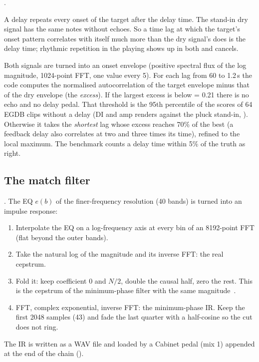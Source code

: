  \done.
\begin{keyidea}
A delay repeats every onset of the target after the delay time. The stand-in dry
signal has the same notes without echoes. So a time lag at which the target's
onset pattern correlates with itself much more than the dry signal's does is the
delay time; rhythmic repetition in the playing shows up in both and cancels.
\end{keyidea}
Both signals are turned into an onset envelope (positive spectral flux of the log
magnitude, 1024-point FFT, one value every 5\ms). For each lag from 60\ms{} to
1.2\,s the code computes the normalised autocorrelation of the target envelope
minus that of the dry envelope (the \emph{excess}). If the largest excess is
below  = 0.21 there is no echo and no delay pedal. That
threshold is the 95th percentile of the scores of 64 EGDB clips without a delay
(DI and amp renders against the pluck stand-in, ). Otherwise it takes the
\emph{shortest} lag whose excess reaches 70\% of the best (a feedback delay also
correlates at two and three times its time), refined to the local maximum. The
benchmark counts a delay time within 5\% of the truth as right.

\subsection{The match filter}
\label{sec:impl-match}

 \done. The EQ $e(b)$ of the finer-frequency resolution
(40 bands) is turned into an impulse response:
\begin{enumerate}
\item Interpolate the EQ on a log-frequency axis at every bin of an 8192-point
  FFT (flat beyond the outer bands).
\item Take the natural log of the magnitude and its inverse FFT: the real
  cepstrum.
\item Fold it: keep coefficient 0 and $N/2$, double the causal half, zero the
  rest. This is the cepstrum of the minimum-phase filter with the same
  magnitude~\cite{oppenheim2010dtsp}.
\item FFT, complex exponential, inverse FFT: the minimum-phase IR. Keep the
  first 2048 samples (43\ms) and fade the last quarter with a half-cosine so the
  cut does not ring.
\end{enumerate}
The IR is written as a WAV file and loaded by a Cabinet pedal (mix 1) appended at
the end of the chain ().

